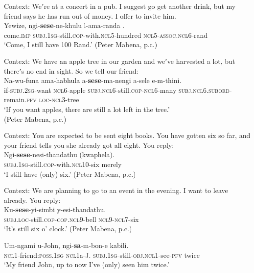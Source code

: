 \begin{exe}
	\ex\label{exAppendixSouthernNdebeleScalar1}
	 Context: Weʼre at a concert in a pub. I suggest go get another drink, but my friend says he has run out of money. I offer to invite him.\\
	\gll   Yewize, ngi-\textbf{sese}-ne-khulu l-ama-randa .\\
	come.\textsc{imp} \textsc{subj}.1\textsc{sg}-still.\textsc{cop}-with.\textsc{ncl}5-hundred \textsc{ncl}5-\textsc{assoc}.\textsc{ncl}6-rand\\
	\glt \lq Come, I still have 100 Rand.' (Peter Mabena, p.c.)
	
	\ex\label{exAppendixSouthernNdebeleScalar2}
	 Context: We have an apple tree in our garden and weʼve harvested a lot, but thereʼs no end in sight. So we tell our friend:\\
	\gll Na-wu-funa ama-habhula a-\textbf{sese}-ma-nengi a-sele e-m-thini.\\
	if-\textsc{subj}.2\textsc{sg}-want \textsc{ncl}6-apple \textsc{subj}.\textsc{ncl}6-still.\textsc{cop}-\textsc{ncl}6-many \textsc{subj}.\textsc{ncl6}.\textsc{subord}-remain.\textsc{pfv} \textsc{loc}-\textsc{ncl}3-tree\\
	\glt \lq If you want apples, there are still a lot left in the tree.'
	\\(Peter Mabena, p.c.)
	
	\ex\label{exAppendixSouthernNdebeleScalar3}
	 Context: You are expected to be sent eight books. You have gotten six so far, and your friend tells you she already got all eight. You reply:\\
	\gll Ngi-\textbf{sese}-nesi-thandathu \textup{(}kwaphela\textup{)}.\\
	\textsc{subj}.1\textsc{sg}-still.\textsc{cop}-with.\textsc{ncl}10-six \phantom{(}merely\\
	\glt \lq I still have (only) six.' (Peter Mabena, p.c.)
	
	\ex\label{exAppendixSouthernNdebeleScalar4}
	Context: We are planning to go to an event in the evening. I want to leave already. You reply:\\
	\gll Ku-\textbf{sese}-yi-simbi y-esi-thandathu.\\
	\textsc{subj}.\textsc{loc}-still.\textsc{cop}-\textsc{cop}.\textsc{ncl}9-bell \textsc{ncl}9-\textsc{ncl}7-six\\
	\glt \lq It's still six o' clock.' (Peter Mabena, p.c.)

	\ex\label{exAppendixSouthernNdebeleScalar5}
	\gll Um-ngami u-John, ngi-\textbf{sa}-m-bon-e kabili.\\
	\textsc{ncl}1-friend:\textsc{poss}.1\textsc{sg} \textsc{ncl}1a-J. \textsc{subj}.1\textsc{sg}-still-\textsc{obj}.\textsc{ncl}1-see-\textsc{pfv} twice\\
	\glt \lq My friend John, up to now I've (only) seen him twice.\rq{ }\parencite[243]{CranePersohn2021}		
		\end{exe}




